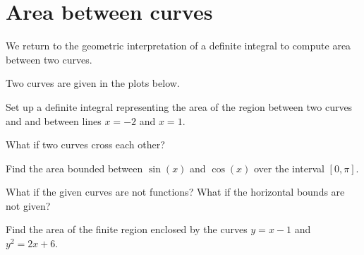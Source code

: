 \documentclass[../main.tex]{subfiles}
\begin{document}
 \section{Area between curves}
We return to the geometric interpretation of a definite integral to compute area between two curves.

\begin{example}
  Two curves are given in the plots below. 
  \begin{figure}[H]
    \centering
    
    \hfill{}
    
    \hfill{}
    
  \end{figure}

  Set up a definite integral representing the area of the region between two curves  and  and between lines \(x = -2\) and \(x = 1\).

\end{example}

What if two curves cross each other?
\begin{example}
  Find the area bounded between \(\sin(x)\) and \(\cos(x)\) over the interval \([0, \pi]\).

  

\end{example}
\clearpage

What if the given curves are not functions? What if the horizontal bounds are not given?
\begin{example}
  Find the area of the finite region enclosed by the curves \(y = x - 1\) and \(y^{2} = 2x + 6\).

  
  

\end{example}
\end{document}
